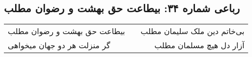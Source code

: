 \begin{center}
\section*{رباعی شماره ۳۴: بیطاعت حق بهشت و رضوان مطلب}
\label{sec:sh034}
\begin{longtable}{l p{0.5cm} r}
بیطاعت حق بهشت و رضوان مطلب
&&
بی‌خاتم دین ملک سلیمان مطلب
\\
گر منزلت هر دو جهان میخواهی
&&
آزار دل هیچ مسلمان مطلب
\\
\end{longtable}
\end{center}
